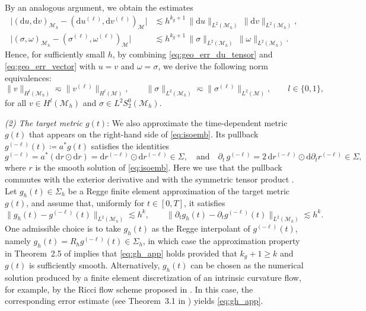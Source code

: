 \documentclass[11pt,a4paper,oneside,reqno]{amsart}
\theoremstyle{definition}
\theoremstyle{plain}
\numberwithin{theorem}{section}
\numberwithin{proposition}{section}
\numberwithin{lemma}{section}
\numberwithin{equation}{section}
\newcommand{\Man}{\mathcal{M}}
\begin{document}
By an analogous argument, we obtain the estimates 
\begin{subequations}\label{eq:geo_err_du_tensor}
\begin{align}
\label{eq:geo_err_du} 
\bigl|(\mathrm{d}u,\mathrm{d}v)_{\Man_h} 
 - (\mathrm{d}u^{(\ell)},\mathrm{d}v^{(\ell)})_{\Man}\bigr|
&\lesssim h^{k_g+1}\,\|\mathrm{d}u\|_{L^2(\Man_h)}\,\|\mathrm{d}v\|_{L^2(\Man_h)}, \\
\label{eq:geo_err_tensor}
\bigl|(\sigma,\omega)_{\Man_h} 
 - (\sigma^{(\ell)},\omega^{(\ell)})_{\Man}\bigr|
&\lesssim h^{k_g+1}\,\|\sigma\|_{L^2(\Man_h)}\,\|\omega\|_{L^2(\Man_h)}.
\end{align}
\end{subequations}
Hence, for sufficiently small $h$, by combining \eqref{eq:geo_err_du_tensor} 
and \eqref{eq:geo_err_vector} with $u=v$ and $\omega=\sigma$, 
we derive the following norm equivalences:
\begin{equation}\label{eq:norm-equi} 
\|v\|_{H^{l}(\Man_h)} 
\eqsim 
\|v^{(\ell)}\|_{H^{l}(\Man)}, 
\qquad 
\|\sigma\|_{L^2(\Man_h)}
\eqsim 
\|\sigma^{(\ell)}\|_{L^2(\Man)}, 
\qquad 
l \in \{0,1\},
\end{equation}
for all $v \in H^{l}(\Man_h)$ and $\sigma \in L^2 S_{2}^{0}(\Man_h)$.




\textit{(2) The target metric \(g(t)\)}:
We also approximate the time-dependent metric \(g(t)\) that appears on the right-hand side of \eqref{eq:isoemb}.
Its pullback \(g^{(-\ell)}(t)\coloneqq a^*g(t)\) satisfies the identities
\begin{equation}\label{eq:g_ell}
g^{(-\ell)} = a^*(\mathrm{d}r\odot \mathrm{d}r)
= \mathrm{d}r^{(-\ell)}\odot \mathrm{d}r^{(-\ell)} \in \Sigma,
\quad\text{and}\quad
\partial_t \, g^{(-\ell)} = 2\,\mathrm{d}r^{(-\ell)}\odot \mathrm{d}\partial_t r^{(-\ell)} \in \Sigma,
\end{equation}
where \(r\) is the smooth solution of \eqref{eq:isoemb}. Here we use that the pullback commutes with the exterior derivative and with the symmetric tensor product \cite{johnlee}.
Let \(g_h(t)\in\Sigma_h\) be a Regge finite element approximation of the target metric \(g(t)\), and assume that, uniformly for \(t\in[0,T]\), it satisfies 
\begin{equation}\label{eq:gh_app} 
    \|g_h(t) - g^{(-\ell)}(t)\|_{L^2(\Man_h)} \lesssim h^k, \qquad \|\partial_t g_h(t) - \partial_t g^{(-\ell)}(t)\|_{L^2(\Man_h)} \lesssim h^k. 
\end{equation}
One admissible choice is to take \(g_h(t)\) as the Regge interpolant of \(g^{(-\ell)}(t)\), namely \(g_h(t)=R_h g^{(-\ell)}(t)\in\Sigma_h\), in which case the approximation property in Theorem~2.5 of \cite{li2018regge} implies that \eqref{eq:gh_app} holds provided that \(k_g+1\ge k\) and \(g(t)\) is sufficiently smooth.
Alternatively, \(g_h(t)\) can be chosen as the numerical solution produced by a finite element discretization of an intrinsic curvature flow, for example, by the Ricci flow scheme proposed in \cite{gawlik2019finite, gao2025ricci}. In this case, the corresponding error estimate (see Theorem~3.1 in \cite{gao2025ricci}) yields \eqref{eq:gh_app}.
\end{document}
